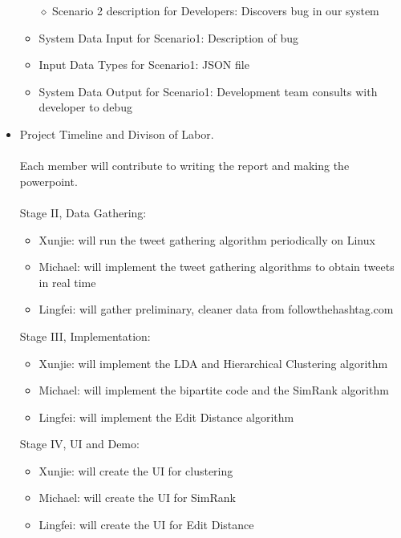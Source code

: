 \documentclass[10pt]{article}
\begin{document}
\begin{itemize}
	\begin{itemize} 
	\item[$\diamond$]{Scenario 2 description for Developers: }
	Discovers bug in our system
	\item{System Data Input for Scenario1: }
	Description of bug
	\item{Input Data Types for Scenario1: }
	JSON file
	\item{System Data Output for Scenario1: }
	Development team consults with developer to debug
	\end{itemize}
\item{Project Timeline and Divison of Labor.}
\\\\ Each member will contribute to writing the report and making the powerpoint.
\\\\ Stage II, Data Gathering:
\begin{itemize} 
\item{Xunjie: will run the tweet gathering algorithm periodically on Linux}
\item{Michael: will implement the tweet gathering algorithms to obtain tweets in real time}
\item{Lingfei: will gather preliminary, cleaner data from followthehashtag.com}
\end{itemize}
Stage III, Implementation:
\begin{itemize} 
\item{Xunjie: will implement the LDA and Hierarchical Clustering algorithm}
\item{Michael: will implement the bipartite code and the SimRank algorithm}
\item{Lingfei: will implement the Edit Distance algorithm}
\end{itemize}
Stage IV, UI and Demo:
\begin{itemize} 
\item{Xunjie: will create the UI for clustering}
\item{Michael: will create the UI for SimRank}
\item{Lingfei: will create the UI for Edit Distance}
\end{itemize}
\end{itemize}
\end{document}
